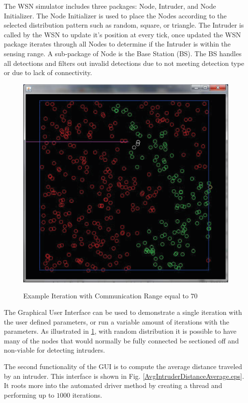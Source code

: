 \documentclass[10pt, conference, compsocconf, twocolumn]{IEEEtran}
\begin{document}

The WSN simulator includes three packages: Node, Intruder, and Node
Initializer. The Node Initializer is used to place the Nodes
according to the selected distribution pattern such as random,
square, or triangle. The Intruder is called by the WSN to update
it's position at every tick, once updated the WSN package iterates
through all Nodes to determine if the Intruder is within the sensing
range.  A sub-package of Node is the Base Station (BS). The BS
handles all detections and filters out invalid detections due to not
meeting detection type or due to lack of connectivity.

 \begin{figure} [h]
  \centering
  \includegraphics[width=1.6 in]{SingleAnimationExample2.eps}\\
  \caption{Example Iteration with Communication Range equal to $70$}\label{SingleAnimationExample2.eps}
\end{figure}

The Graphical User Interface can be used to demonstrate a single
iteration with the user defined parameters, or run a variable amount
of iterations with the parameters.  As illustrated in
\ref{SingleAnimationExample2.eps}, with random distribution it is
possible to have many of the nodes that would normally be fully
connected be sectioned off and non-viable for detecting intruders.


The second functionality of the GUI is to compute the average
distance traveled by an intruder.  This interface is shown in Fig.
\ref{AvgIntruderDistanceAverage.eps}. It roots more into the
automated driver method by creating a thread and performing up to
$1000$ iterations.
\end{document}
